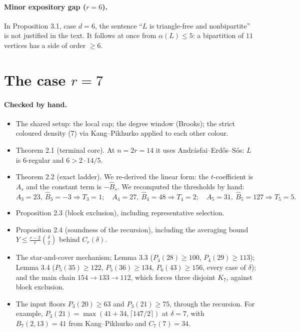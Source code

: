 \documentclass[11pt]{amsart}
\theoremstyle{remark}\newtheorem*{remark}{Remark}
\begin{document}
\paragraph{Minor expository gap ($r=6$).} In Proposition 3.1, case $d=6$, the sentence ``$L$ is triangle-free and nonbipartite''
is not justified in the text. It follows at once from $\alpha(L)\le5$: a bipartition of $11$ vertices has a side of order $\ge6$.

\section{The case $r=7$}
\paragraph{Checked by hand.}
\begin{itemize}
\item The shared setup: the local cap; the degree window (Brooks); the strict coloured density (7) via Kang--Pikhurko applied to
  each other colour.
\item Theorem 2.1 (terminal core). At $n=2r=14$ it uses Andr\'asfai--Erd\H{o}s--S\'os: $L$ is $6$-regular and $6>2\cdot14/5$.
\item Theorem 2.2 (exact ladder). We re-derived the linear form: the $t$-coefficient is $A_s$ and the constant term is $-\widehat B_s$.
  We recomputed the thresholds by hand:
  \[
   A_3=23,\ \widehat B_3=-3\Rightarrow T_3=1;\quad A_4=27,\ \widehat B_4=48\Rightarrow T_4=2;\quad
   A_5=31,\ \widehat B_5=127\Rightarrow T_5=5 .
  \]
\item Proposition 2.3 (block exclusion), including representative selection.
\item Proposition 2.4 (soundness of the recursion), including the averaging bound $Y\le\frac{r-2}{r}\binom\delta2$ behind $C_r(\delta)$.
\item The star-and-cover mechanism; Lemma 3.3 ($P_4(28)\ge100$, $P_4(29)\ge113$); Lemma 3.4 ($P_5(35)\ge122$, $P_5(36)\ge134$,
  $P_6(43)\ge156$, every case of $\delta$); and the main chain $154\to133\to112$, which forces three disjoint $K_7$, against
  block exclusion.
\item The input floors $P_3(20)\ge63$ and $P_3(21)\ge75$, through the recursion. For example, $P_3(21)=\max(41+34,\lceil 147/2\rceil)$
  at $\delta=7$, with $B_7(2,13)=41$ from Kang--Pikhurko and $C_7(7)=34$.
\end{itemize}
\end{document}
